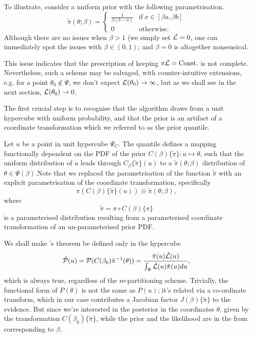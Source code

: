 \documentclass[usenatbib]{mnras}
\begin{document}
To illustrate, consider a uniform prior with the following
parametrisation.
\begin{equation}
  \tilde{\pi}(\theta; \beta) =
  \begin{cases}
	\frac{1}{\beta(b-a)} & \text{if}\ x \in [\beta a, \beta b] \\
	0 & \text{otherwise}.
  \end{cases}
\end{equation}
Although there are no issues when \(\beta>1\) (we simply set \({\cal
	\tilde{L}}=0\), one can immediately spot the issues with \(\beta \in (0,1)\);
and \(\beta=0\) is altogether nonsensical.

This issue indicates that the prescription of keeping \(\pi {\cal
	L} = \text{Const.}\) is not complete. Nevertheless, such a scheme
may be salvaged, with counter-intuitive extensions, e.g. for a
point \(\theta_{0} \notin \Psi\), we don't expect \({\cal
	L}(\theta_{0}) \rightarrow \infty\), but as we shall see in the
next section, \({\cal L}(\theta_{0}) \rightarrow 0\).

The first crucial step is to recognise that the algorithm draws
from a unit hypercube with uniform probability, and that the prior
is an artifact of a coordinate transformation which we referred to
as the prior quantile.

Let \(u\) be a point in unit hypercube \(\Psi_{C}\). The quantile
defines a mapping functionally dependent on the PDF of the prior
\(C(\beta)\lbrace \tilde{\pi}\rbrace:u \mapsto \theta\), such that
the uniform distribution of \(u\) leads through
\(C_{\beta}\{\tilde{\pi}\}(u)\) to a \(\tilde{\pi}(\theta;\beta)\)
distribution of \(\theta \in\Psi(\beta)\).Note that we replaced the
parametrisation of the function \(\tilde{\pi}\) with an explicit
parametrisation of the coordinate transformation, specifically
\begin{equation}
  \pi(C(\beta)\{\tilde{\pi}\}(u)) \equiv \tilde{\pi}(\theta; \beta),
\end{equation}
where 
\begin{equation}
  \tilde{\pi} =  \pi \circ C(\beta) \{ \pi \} 
\end{equation}
is a parameterised distribution resulting from a parameterised
coordinate transformation of an un-parameterised prior PDF.

We shall make \citeauthor{1763} 's theorem be defined only in the
hypercube
\begin{equation}
{\cal \hat{P}}(u) = {\cal P}(C(\beta_{0}){\tilde{\pi}}^{-1}(\theta)) = \frac{\hat{\pi} (u) {\cal \hat{L}}(u)}{\int_{\Psi}{\cal \hat{L}}(u) \hat{\pi}(u) du},
\end{equation}
which is always true, regardless of the re-partitioning
scheme. Trivially, the functional form of \(P(\theta)\) is not the same
as \(P(u)\); it's related via a co-ordinate transform, which in our
case contributes a Jacobian factor \(J(\beta)\{\tilde{\pi}\}\) to the
evidence. But since we're interested in the posterior in the
coordinates \(\theta\), given by the transformation \(C(\beta_{0})\{\tilde{\pi}\}\),
while the prior and the likelihood are in the from corresponding
to \(\beta\).
\end{document}
